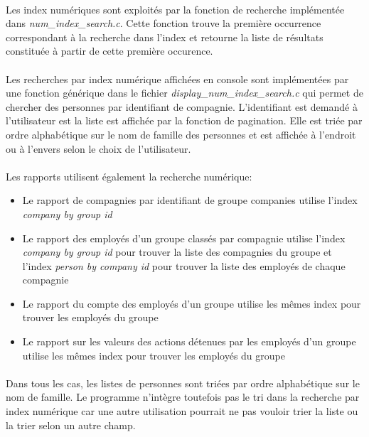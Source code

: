 \documentclass{article}
\begin{document}
    \paragraph{}
    Les index numériques sont exploités par la fonction de recherche implémentée dans \emph{num\_index\_search.c}. Cette fonction trouve la première occurrence correspondant à la recherche dans l'index et retourne la liste de résultats constituée à partir de cette première occurence.

    \paragraph{}
    Les recherches par index numérique affichées en console sont implémentées par une fonction générique dans le fichier \emph{display\_num\_index\_search.c} qui permet de chercher des personnes par identifiant de compagnie. L'identifiant est demandé à l'utilisateur est la liste est affichée par la fonction de pagination. Elle est triée par ordre alphabétique sur le nom de famille des personnes et est affichée à l'endroit ou à l'envers selon le choix de l'utilisateur.

    \paragraph{}
    Les rapports utilisent également la recherche numérique:
    \begin{itemize}[label=$\bullet$]
        \item Le rapport de compagnies par identifiant de groupe companies utilise l'index \emph{company by group id}
        \item Le rapport des employés d'un groupe classés par compagnie utilise l'index \emph{company by group id} pour trouver la liste des compagnies du groupe et l'index \emph{person by company id} pour trouver la liste des employés de chaque compagnie
        \item Le rapport du compte des employés d'un groupe utilise les mêmes index pour trouver les employés du groupe
        \item Le rapport sur les valeurs des actions détenues par les employés d'un groupe utilise les mêmes index pour trouver les employés du groupe
    \end{itemize}

    \paragraph{}
    Dans tous les cas, les listes de personnes sont triées par ordre alphabétique sur le nom de famille. Le programme n'intègre toutefois pas le tri dans la recherche par index numérique car une autre utilisation pourrait ne pas vouloir trier la liste ou la trier selon un autre champ.
    
\end{document}
